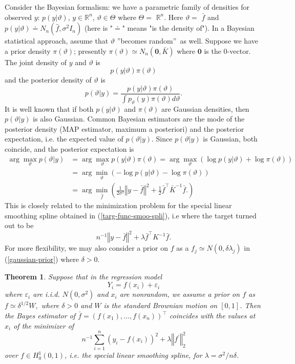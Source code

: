 \documentclass[11pt,twoside]{article}%
\theoremstyle{change}
\newtheorem{theorem}{Theorem}[section]
\begin{document}
Consider the Bayesian formalism: we have a parametric family of densities for
observed $y$: $p(y|\vartheta)$, $y\in\mathbb{R}^{n}$, $\vartheta\in\Theta$
where $\Theta=$ $\mathbb{R}^{n}$. Here $\vartheta=$ $\bar{f}$ and
$p(y|\vartheta)\doteq N_{n}(\hat{f},\sigma^{2}I_{n})$ (here is "$\doteq$"
means "is the density of"). In a Bayesian statistical approach, assume that
$\vartheta$ \textquotedblright becomes random\textquotedblright\ as well.
Suppose we have a prior density $\pi(\vartheta)$; presently $\pi
(\vartheta)\simeq N_{n}(\mathbf{0},\bar{K})$ where $\mathbf{0}$ is the
$0$-vector. The joint density of $y$ and $\vartheta$ is
\[
p(y|\vartheta)\pi(\vartheta)
\]
and the posterior density of $\vartheta$ is
\[
p(\vartheta|y)=\frac{p(y|\vartheta)\pi(\vartheta)}{\int p_{\vartheta}%
(y)\pi(\vartheta)d\vartheta}.
\]
It is well known that if both $p(y|\vartheta)$ and $\pi(\vartheta)$ are
Gaussian densities, then $p(\vartheta|y)$ is also Gaussian. Common Bayesian
estimators are the mode of the posterior density (MAP estimator, maximum a
posteriori) and the posterior expectation, i.e. the expected value of
$p(\vartheta|y)$. Since $p(\vartheta|y)$ is Gaussian, both coincide, and the
posterior expectation is
\begin{align*}
\arg\max_{\vartheta}p(\vartheta|y)  & =\arg\max_{\vartheta}p(y|\vartheta
)\pi(\vartheta)=\arg\max_{\vartheta}\left(  \log p(y|\vartheta)+\log
\pi(\vartheta)\right) \\
& =\arg\min_{\vartheta}\left(  -\log p(y|\vartheta)-\log\pi(\vartheta)\right)
\\
& =\arg\min_{\hat{f}}\left(  \frac{1}{2\sigma^{2}}\left\Vert y-\bar
{f}\right\Vert ^{2}+\frac{1}{2}\bar{f}^{\top}\bar{K}^{-1}\bar{f}.\right)
\end{align*}
This is closely related to the minimization problem for the special linear
smoothing spline obtained in (\ref{targ-func-smoo-spli}), i.e where the target
turned out to be
\[
n^{-1}\left\Vert y-\bar{f}\right\Vert ^{2}+\lambda\bar{f}^{\top}K^{-1}\bar{f}.
\]
For more flexibility, we may also consider a prior on $f$ as a $f_{j}\simeq
N\left(  0,\delta\lambda_{j}\right)  $ in (\ref{gaussian-prior}) where
$\delta>0$.

\begin{theorem}
Suppose that in the regression model
\[
Y_{i}=f(x_{i})+\varepsilon_{i}%
\]
where $\varepsilon_{i}$ are i.i.d. $N(0,\sigma^{2})$ and $x_{i}$ are
nonrandom, we assume a prior on $f$ as $f\simeq\delta^{1/2}W,$ where
$\delta>0$ and $W$ is the standard Brownian motion on $[0,1]$. Then the Bayes
estimator of $\bar{f}=\left(  f(x_{1}),\ldots,f(x_{n})\right)  ^{\top}$
coincides with the values at $x_{i}$ of the minimizer of
\[
n^{-1}\sum_{i=1}^{n}\left(  y_{i}-f(x_{i})\right)  ^{2}+\lambda\left\Vert
f^{\prime}\right\Vert _{2}^{2}%
\]
over $f\in H_{0}^{1}(0,1)$, i.e. the special linear smoothing spline, for
$\lambda=\sigma^{2}/n\delta$.
\end{theorem}
\end{document}
